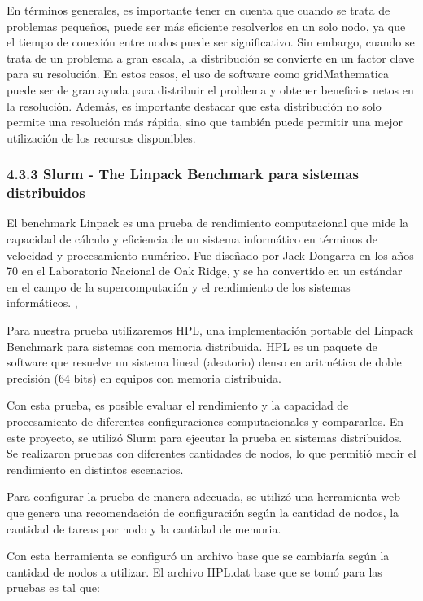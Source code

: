 \begin{spacing}{1.5}
  En términos generales, es importante tener en cuenta que cuando se trata de problemas pequeños, puede ser más eficiente resolverlos en un solo nodo, ya que el tiempo de conexión entre nodos puede ser significativo. Sin embargo, cuando se trata de un problema a gran escala, la distribución se convierte en un factor clave para su resolución. En estos casos, el uso de software como gridMathematica puede ser de gran ayuda para distribuir el problema y obtener beneficios netos en la resolución. Además, es importante destacar que esta distribución no solo permite una resolución más rápida, sino que también puede permitir una mejor utilización de los recursos disponibles.

  \subsubsection{4.3.3 Slurm - The Linpack Benchmark para sistemas distribuidos}

  El benchmark Linpack es una prueba de rendimiento computacional que mide la capacidad de cálculo y eficiencia de un sistema informático en términos de velocidad y procesamiento numérico. Fue diseñado por Jack Dongarra en los años 70 en el Laboratorio Nacional de Oak Ridge, y se ha convertido en un estándar en el campo de la supercomputación y el rendimiento de los sistemas informáticos. \cite{linpack},  \cite{faq-linpack}

  Para nuestra prueba utilizaremos HPL, una implementación portable del Linpack Benchmark para sistemas con memoria distribuida. HPL es un paquete de software que resuelve un sistema lineal (aleatorio) denso en aritmética de doble precisión (64 bits) en equipos con memoria distribuida.\cite{hpl-linpack}

  Con esta prueba, es posible evaluar el rendimiento y la capacidad de procesamiento de diferentes configuraciones computacionales y compararlos. En este proyecto, se utilizó Slurm para ejecutar la prueba en sistemas distribuidos. Se realizaron pruebas con diferentes cantidades de nodos, lo que permitió medir el rendimiento en distintos escenarios.

  Para configurar la prueba de manera adecuada, se utilizó una herramienta web que genera una recomendación de configuración según la cantidad de nodos, la cantidad de tareas por nodo y la cantidad de memoria.\cite{tune-hpl-dat-file}

  Con esta herramienta se configuró un archivo base que se cambiaría según la cantidad de nodos a utilizar. El archivo HPL.dat base que se tomó para las pruebas es tal que:


\end{spacing}
